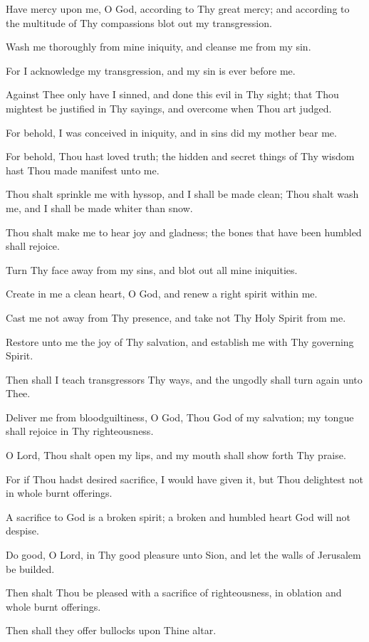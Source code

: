 Have mercy upon me, O God, according to Thy great mercy; and according to the multitude of Thy compassions blot out my transgression.

Wash me thoroughly from mine iniquity, and cleanse me from my sin.

For I acknowledge my transgression, and my sin is ever before me.

Against Thee only have I sinned, and done this evil in Thy sight; that Thou mightest be justified in Thy sayings, and overcome when Thou art judged.

For behold, I was conceived in iniquity, and in sins did my mother bear me.

For behold, Thou hast loved truth; the hidden and secret things of Thy wisdom hast Thou made manifest unto me.

Thou shalt sprinkle me with hyssop, and I shall be made clean; Thou shalt wash me, and I shall be made whiter than snow.

Thou shalt make me to hear joy and gladness; the bones that have been humbled shall rejoice.

Turn Thy face away from my sins, and blot out all mine iniquities.

Create in me a clean heart, O God, and renew a right spirit within me.

Cast me not away from Thy presence, and take not Thy Holy Spirit from me.

Restore unto me the joy of Thy salvation, and establish me with Thy governing Spirit.

Then shall I teach transgressors Thy ways, and the ungodly shall turn again unto Thee.

Deliver me from bloodguiltiness, O God, Thou God of my salvation; my tongue shall rejoice in Thy righteousness.

O Lord, Thou shalt open my lips, and my mouth shall show forth Thy praise.

For if Thou hadst desired sacrifice, I would have given it, but Thou delightest not in whole burnt offerings.

A sacrifice to God is a broken spirit; a broken and humbled heart God will not despise.

Do good, O Lord, in Thy good pleasure unto Sion, and let the walls of Jerusalem be builded.

Then shalt Thou be pleased with a sacrifice of righteousness, in oblation and whole burnt offerings.

Then shall they offer bullocks upon Thine altar.
